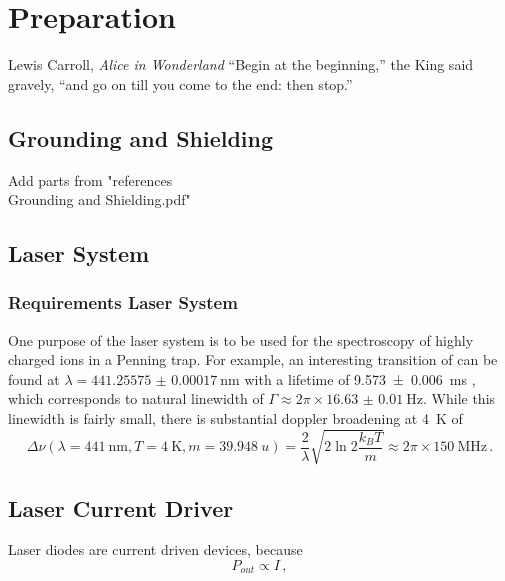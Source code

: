 \chapter{Preparation}
\begin{chapquote}{Lewis Carroll, \textit{Alice in Wonderland}}
``Begin at the beginning,'' the King said gravely, ``and go on till you come to the end: then stop.''
\end{chapquote}
\section{Grounding and Shielding}
Add parts from "references\\Grounding and Shielding.pdf"

\section{Laser System}
\subsection{Requirements Laser System}
One purpose of the laser system is to be used for the spectroscopy of highly charged ions in a Penning trap. For example, an interesting transition of  can be found at $\lambda = \qty{441.25575(17)}{\nm}$ \cite{ar13+_wavelength} with a lifetime of \qty{9.573(6)}{\ms} \cite{ar13+_lifetime}, which corresponds to natural linewidth of $\Gamma \approx 2 \pi \times \qty{16.63(1)}{\Hz}$. While this linewidth is fairly small, there is substantial doppler broadening at \qty{4}{\K} of
\begin{equation}
    \Delta \nu (\lambda = \qty{441}{\nm}, T=\qty{4}{\K}, m=\qty{39.948}{u}) = \frac{2}{\lambda}\sqrt{2 \ln 2 \frac{k_B T}{m}} \approx 2 \pi \times \qty{150}{\MHz} \, . \label{eqn:doppler_broadening}
\end{equation}

\clearpage
\section{Laser Current Driver}
\label{sec:laser_current_driver}
Laser diodes are current driven devices, because
\begin{equation}
    P_{out} \propto I\,, \nonumber
\end{equation}

